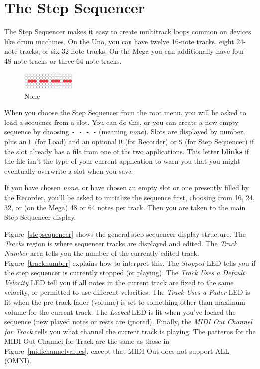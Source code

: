 \documentclass{article}
\begin{document}
\section {The Step Sequencer}

The Step Sequencer makes it easy to create multitrack loops common on devices like drum machines.  On the Uno, you can have twelve 16-note tracks, eight 24-note tracks, or six 32-note tracks.  On the Mega you can additionally have four 48-note tracks or three 64-note tracks.

\begin{figure}
\vspace{-1em}\includegraphics[width=1in]{none.pdf}
\vspace{-2em}\caption{\small None}\vspace{-1em}
\label{none}
\end{figure}

When you choose the Step Sequencer from the root menu, you will be asked to load a sequence from a slot.  You can do this, or you can create a new empty sequence by choosing \texttt{-~-~-~-} (meaning {\it none}).  Slots are displayed by number, plus an \texttt{L} (for Load) and an optional \texttt{R} (for Recorder) or \texttt{S} (for Step Sequencer) if the slot already has a file from one of the two applications.  This letter {\bf blinks} if the file isn't the type of your current application to warn you that you might eventually overwrite a slot when you save.

If you have chosen {\it none}, or have chosen an empty slot or one presently filled by the Recorder, you'll be asked to initialize the sequence first, choosing from 16, 24, 32, or (on the Mega) 48 or 64 notes per track. Then you are taken to the main Step Sequencer display.  

Figure~\ref{stepsequencer} shows the general step sequencer display structure.  The {\it Tracks} region is where sequencer tracks are displayed and edited.  The {\it Track Number} area tells you the number of the currently-edited track.  Figure~\ref{tracknumber} explains how to interpret this.  The {\it Stopped} LED tells you if the step sequencer is currently stopped (or playing).  The {\it Track Uses a Default Velocity} LED tell you if all notes in the current track are fixed to the same velocity, or permitted to use different velocities.  The {\it Track Uses a Fader} LED is lit when the pre-track fader (volume) is set to something other than maximum volume for the current track.  The {\it Locked} LED is lit when you've locked the sequence (new played notes or rests are ignored).  Finally, the {\it MIDI Out Channel for Track} tells you what channel the current track is playing.  The patterns for the MIDI Out Channel for Track are the same as those in Figure~\ref{midichannelvalues}, except that MIDI Out does not support ALL (OMNI).
\end{document}
